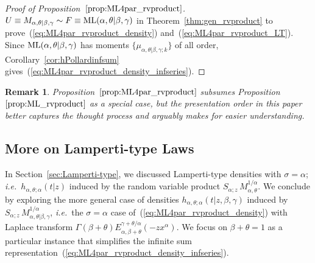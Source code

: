 \documentclass[a4paper,12pt]{article}
\newtheorem{remark}{Remark}
\begin{document}
{{{\begin{proof} [Proof of Proposition~$\ref{prop:ML4par_rvproduct}$]
\label{proof:ML4par_rvproduct}
$U \equiv M_{\alpha,\theta \vert\beta,\gamma} \sim F \equiv {\rm ML}(\alpha,\theta \vert \beta,\gamma)$  in Theorem~\ref{thm:gen_rvproduct}
to prove~(\ref{eq:ML4par_rvproduct_density}) and~(\ref{eq:ML4par_rvproduct_LT}).
Since ${\rm ML}(\alpha,\theta \vert \beta,\gamma)$ has moments $\{\mu_{\alpha,\theta\vert\beta,\gamma;k}\}$ of all order,  
 Corollary~\ref{cor:hPollardinfsum} gives~(\ref{eq:ML4par_rvproduct_density_infseries}).
 \end{proof}

\begin{remark}
\label{rem:ML4par_rvproduct1}
Proposition~$\ref{prop:ML4par_rvproduct}$ subsumes  Proposition~$\ref{prop:ML_rvproduct}$ as a special case,
but the presentation order  in this paper better captures the  thought process  and arguably makes for easier understanding.
\end{remark}

\subsection{More on Lamperti-type Laws}
\label{sec:Lamperti-type_gen}

In Section~\ref{sec:Lamperti-type}, we discussed Lamperti-type densities with $\sigma=\alpha$; {\it i.e.}\
$h_{\alpha,\theta; \alpha}(t \vert z)$ induced by the  random variable product $S_{\alpha;z} \, M_{\alpha,\theta}^{1/\alpha}$.
We conclude by exploring   the more general case of densities   $h_{\alpha,\theta; \alpha}(t \vert z , \beta,\gamma)$ induced  by 
$S_{\alpha;z} \, M_{\alpha,\theta\vert\beta,\gamma}^{1/\alpha}$,
{\it i.e.}\ the $\sigma=\alpha$ case of~(\ref{eq:ML4par_rvproduct_density})    %
with Laplace transform $\Gamma(\beta+\theta)E^{\gamma+\theta/\alpha}_{\alpha,\beta+\theta}(-z x^\alpha)$. 
We focus on $\beta+\theta=1$ as a particular instance that simplifies the infinite sum representation~(\ref{eq:ML4par_rvproduct_density_infseries}).

}}}
\end{document}
